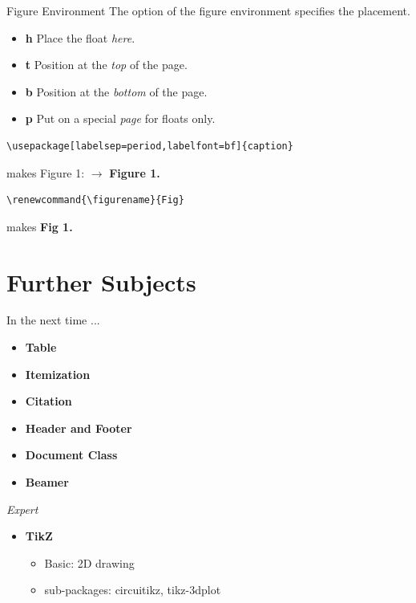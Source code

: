 \documentclass[12pt]{gshs_lecture}
\begin{document}
\begin{frame}[t,fragile]{Figure Environment}\small
The option of the figure environment specifies the placement.
\begin{itemize}
\item \textcolor{GSHSRED}{\textbf{h}} Place the float \emph{here}.
\item \textcolor{GSHSRED}{\textbf{t}} Position at the \emph{top} of the page.
\item \textcolor{GSHSRED}{\textbf{b}} Position at the \emph{bottom} of the page.
\item \textcolor{GSHSRED}{\textbf{p}} Put on a special \emph{page} for floats only.
\end{itemize}
\begin{block}{}
\begin{lstlisting}
\usepackage[labelsep=period,labelfont=bf]{caption}
\end{lstlisting}
\end{block}
makes \textrm{Figure 1:} $\rightarrow$ \textbf{\textrm{Figure 1.}}
\begin{block}{}
\begin{lstlisting}
\renewcommand{\figurename}{Fig}
\end{lstlisting}
\end{block}
makes \textbf{\textrm{Fig 1.}}
\end{frame}

\section{Further Subjects} %

\begin{frame}[t]{In the next time ...}\small
\begin{itemize}
\item \textcolor{GSHSRED}{\textbf{Table}}
\item \textcolor{GSHSRED}{\textbf{Itemization}}
\item \textcolor{GSHSRED}{\textbf{Citation}}
\item \textcolor{GSHSRED}{\textbf{Header and Footer}}
\item \textcolor{GSHSRED}{\textbf{Document Class}}
\item \textcolor{GSHSRED}{\textbf{Beamer}}
\end{itemize}
\vspace*{1.6em}
\emph{Expert}
\begin{itemize}
\item \textcolor{GSHSRED}{\textbf{TikZ}}
\begin{itemize}
\item Basic: 2D drawing
\item sub-packages: circuitikz, tikz-3dplot
\end{itemize}
\end{itemize}
\end{frame}
\end{document}
